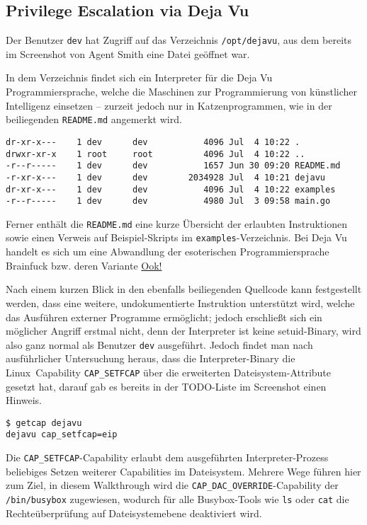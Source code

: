 \subsection{Privilege Escalation via Deja Vu}
Der Benutzer \texttt{dev} hat Zugriff auf das Verzeichnis \texttt{/opt/dejavu}, aus dem bereits im Screenshot von Agent Smith eine Datei geöffnet war.

In dem Verzeichnis findet sich ein Interpreter für die Deja Vu Programmiersprache, welche die Maschinen zur Programmierung von künstlicher Intelligenz einsetzen -- zurzeit jedoch nur in Katzenprogrammen, wie in der beiliegenden \texttt{README.md} angemerkt wird.

\begin{lstlisting}
dr-xr-x---    1 dev      dev           4096 Jul  4 10:22 .
drwxr-xr-x    1 root     root          4096 Jul  4 10:22 ..
-r--r-----    1 dev      dev           1657 Jun 30 09:20 README.md
-r-xr-x---    1 dev      dev        2034928 Jul  4 10:21 dejavu
dr-xr-x---    1 dev      dev           4096 Jul  4 10:22 examples
-r--r-----    1 dev      dev           4980 Jul  3 09:58 main.go
\end{lstlisting}

Ferner enthält die \texttt{README.md} eine kurze Übersicht der erlaubten Instruktionen sowie einen Verweis auf Beispiel-Skripts im \texttt{examples}-Verzeichnis.
Bei Deja Vu handelt es sich um eine Abwandlung der esoterischen Programmiersprache Brainfuck bzw. deren Variante \href{https://de.wikipedia.org/wiki/Ook!}{Ook!}

Nach einem kurzen Blick in den ebenfalls beiliegenden Quellcode kann festgestellt werden, dass eine weitere, undokumentierte Instruktion unterstützt wird, welche das Ausführen externer Programme ermöglicht; jedoch erschließt sich ein möglicher Angriff erstmal nicht, denn der Interpreter ist keine setuid-Binary, wird also ganz normal als Benutzer \texttt{dev} ausgeführt.
Jedoch findet man nach ausführlicher Untersuchung heraus, dass die Interpreter-Binary die Linux~Capability \texttt{CAP\_SETFCAP} über die erweiterten Dateisystem-Attribute gesetzt hat, darauf gab es bereits in der TODO-Liste im Screenshot einen Hinweis.

\begin{lstlisting}
$ getcap dejavu
dejavu cap_setfcap=eip
\end{lstlisting}

Die \texttt{CAP\_SETFCAP}-Capability erlaubt dem ausgeführten Interpreter-Prozess beliebiges Setzen weiterer Capabilities im Dateisystem.
Mehrere Wege führen hier zum Ziel, in diesem Walkthrough wird die \texttt{CAP\_DAC\_OVERRIDE}-Capability der \texttt{/bin/busybox} zugewiesen, wodurch für alle Busybox-Tools wie \texttt{ls} oder \texttt{cat} die Rechteüberprüfung auf Dateisystemebene deaktiviert wird.

